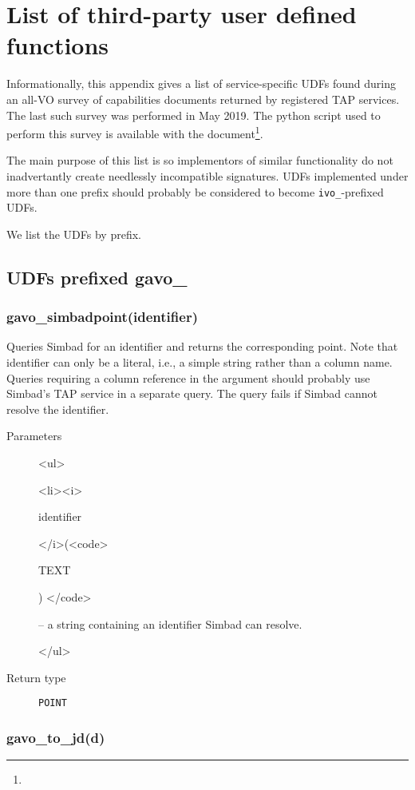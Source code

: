 \documentclass[11pt,a4paper]{ivoa}
\newenvironment{args}%
{\begin{html}<ul>\end{html}\def\arg##1(##2){\begin{html}<li><i>\end{html}%
  ##1 \begin{html}</i>(<code>\end{html}##2\begin{html}) </code>\end{html}}}%
{\begin{html}</ul>\end{html}}
\newenvironment{args}%
  {\hfil %
    \def\arg##1(##2){\item {\textit{##1} (\texttt{##2})}}
    \begin{list}{$\bullet$}{\topsep=0pt\partopsep=0pt\parsep=0pt}
    }%
  {\end{list}}
\begin{document}
\appendix

\section{List of third-party user defined functions}
\label{app:otherudfs}

Informationally, this appendix gives a list of service-specific UDFs
found during an all-VO survey of capabilities documents returned by
registered TAP services.  The last such survey was performed in May
2019.  The python script used to perform this survey is available
with the document\footnote{}.

The main purpose of this list is so implementors of similar
functionality do not inadvertantly create needlessly incompatible
signatures.  UDFs implemented under more than one prefix should probably
be considered to become \verb|ivo_|-prefixed UDFs.

We list the UDFs by prefix.

\subsection{UDFs prefixed gavo\_}

\subsubsection{gavo\_simbadpoint(identifier)}

Queries Simbad for an identifier and returns the corresponding point.
Note that identifier can only be a literal, i.e., a simple string
rather than a column name.  Queries requiring a column reference in the
argument should probably use Simbad's TAP service in a separate query.
The query fails if Simbad cannot resolve the identifier.

\begin{description}
\item[Parameters]
\begin{args}
	\arg identifier (TEXT) -- a string containing an identifier Simbad can
	resolve.
\end{args}

\item[Return type] \texttt{POINT}
\end{description}

\subsubsection{gavo\_to\_jd(d)}
\end{document}
